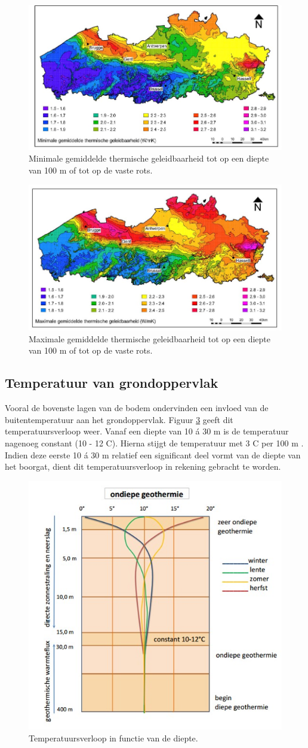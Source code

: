 \documentclass[a4paper,oneside,11pt]{report}
\numberwithin{figure}{section}
\numberwithin{table}{section}
\numberwithin{equation}{section}
\begin{document}
\begin{figure}[hbtp] 
	\centering
	\includegraphics[width=0.7 \textwidth]{invlf_fig2.jpg}
	\caption{Minimale gemiddelde thermische geleidbaarheid tot op een diepte van 100 m of tot op de vaste rots.}
	\label{fig:invlf_2}
\end{figure}

\begin{figure}[hbtp] 
	\centering
	\includegraphics[width=0.7 \textwidth]{invlf_fig3.jpg}
	\caption{Maximale gemiddelde thermische geleidbaarheid tot op een diepte van 100 m of tot op de vaste rots.}
	\label{fig:invlf_3}
\end{figure}


\subsection*{Temperatuur van grondoppervlak}
Vooral de bovenste lagen van de bodem ondervinden een invloed van de buitentemperatuur aan het grondoppervlak. Figuur \ref{fig:invlf_4} geeft dit temperatuursverloop weer. Vanaf een diepte van 10 \'a 30 m is de temperatuur nagenoeg constant (10 - 12 \degree C). Hierna stijgt de temperatuur met 3 \degree C per 100 m \cite{}. Indien deze eerste 10 \'a 30 m relatief een significant deel vormt van de diepte van het boorgat, dient dit temperatuursverloop in rekening gebracht te worden. 
 
\begin{figure}[hbtp] 
	\centering
	\includegraphics[width=0.45 \textwidth]{invlf_fig4.jpg}
	\caption{Temperatuursverloop in functie van de diepte.}
	\label{fig:invlf_4}
\end{figure}
\end{document}
